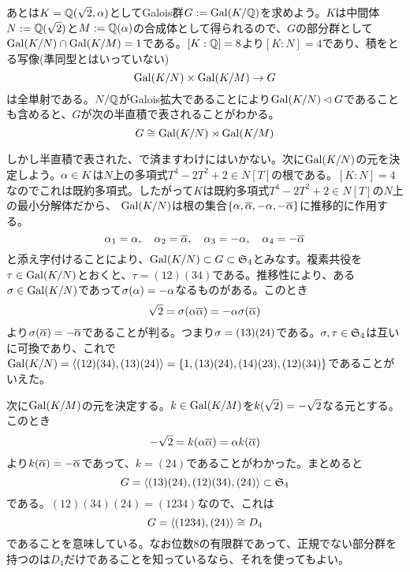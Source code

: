 \begin{sol}
あとは$K = {\mathbb Q}(\sqrt{2}, {\alpha})$としてGalois群$G := \operatorname{Gal}(K/{\mathbb Q})$を求めよう。$K$は中間体$N := {\mathbb Q}(\sqrt{2})$と$M := {\mathbb Q}({\alpha})$の合成体として得られるので、$G$の部分群として$\operatorname{Gal} (K/N) \cap \operatorname{Gal}(K/M) = 1$である。$[K:{\mathbb Q}] = 8$より$[K:N]=4$であり、積をとる写像(準同型とはいっていない)
\[
\operatorname{Gal} (K/N) \times \operatorname{Gal}(K/M) \to G
\]
は全単射である。$N/{\mathbb Q}$がGalois拡大であることにより$\operatorname{Gal}(K/N) \lhd G$であることも含めると、$G$が次の半直積で表されることがわかる。
\[
G \cong \operatorname{Gal} (K/N) \rtimes \operatorname{Gal}(K/M)
\]

しかし半直積で表された、で済ますわけにはいかない。次に$\operatorname{Gal}(K/N)$の元を決定しよう。${\alpha} \in K$は$N$上の多項式$T^4 - 2T^2 + 2 \in N[T]$の根である。$[K:N]=4$なのでこれは既約多項式。したがって$K$は既約多項式$T^4 - 2T^2 +2 \in N[T]$の$N$上の最小分解体だから、
$\operatorname{Gal}(K/N)$は根の集合$\{ {\alpha}, \overline{{\alpha}} , - {\alpha}, - \overline{{\alpha}} \}$に推移的に作用する。
\[
{\alpha}_1 = {\alpha} , \quad {\alpha}_2 = \overline{{\alpha}} , \quad {\alpha}_3 = - {\alpha} , \quad {\alpha}_4 = - \overline{{\alpha}}
\]
と添え字付けることにより、$\operatorname{Gal}(K/N) \subset G \subset \mathfrak{S}_4$とみなす。複素共役を$\tau \in \operatorname{Gal}(K/N)$とおくと、$\tau = (12)(34)$である。推移性により、ある${\sigma} \in \operatorname{Gal}(K/N)$であって${\sigma}({\alpha} ) = - {\alpha}$なるものがある。このとき
\[
\sqrt{2} = {\sigma}( {\alpha} \overline{{\alpha}} ) = - {\alpha}  {\sigma}(\overline{{\alpha}} )
\]
より${\sigma}( \overline{{\alpha}}) = - \overline{{\alpha}}$であることが判る。つまり${\sigma} = (13)(24)$である。${\sigma} , \tau \in \mathfrak{S}_4$は互いに可換であり、これで$\operatorname{Gal}(K/N) = \langle (12)(34) , (13)(24)  \rangle = \{ 1, (1 3)(2 4), (1  4)(2  3), (1  2)(3  4) \}$であることがいえた。

次に$\operatorname{Gal}(K/M)$の元を決定する。$k \in \operatorname{Gal}(K/M)$を$k(\sqrt{2}) = -\sqrt{2}$なる元とする。このとき
\[
- \sqrt{2} = k( {\alpha} \overline{{\alpha}}) = {\alpha} k( \overline{{\alpha}})
\]
より$k(\overline{{\alpha}}) = - \overline{{\alpha}}$であって、$k = (2 4)$であることがわかった。まとめると
\[
G = \langle  (1 3)(2 4), (1  2)(3  4) , (2 4)  \rangle \subset \mathfrak{S}_4
\]
である。$(12)(34)(24)=(1234)$なので、これは
\[
G = \langle  (1234), (24)  \rangle \cong D_4
\]
であることを意味している。なお位数$8$の有限群であって、正規でない部分群を持つのは$D_4$だけであることを知っているなら、それを使ってもよい。
\end{sol}


\newpage


